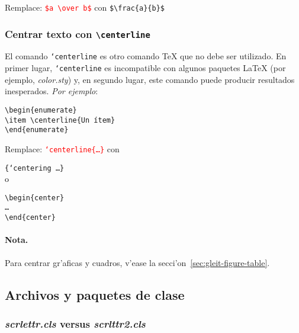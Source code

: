 \documentclass[11pt,a4paper,pagesize,tablecaptionabove,abstracton,pointlessnumbers]{scrartcl}
\newcommand{\Paket}[1]{\textsf{\textsl{#1.sty}}\xspace}
\newcommand{\Klasse}[1]{\textsf{\textsl{#1.cls}}\xspace}
\newcommand{\Env}[2]{\raggedright\texttt{\textbackslash begin\{#1\}\\
    #2\\ \textbackslash end\{#1\}}}
\DeclareRobustCommand*{\Macro}[1]{\mbox{\texttt{\char`\\#1}}}
\DeclareRobustCommand*{\LMacro}[2]{\mbox{\texttt{\char`\\#1\{#2\}}}}
\DeclareRobustCommand*{\GMacro}[2]{\mbox{\texttt{\{\char`\\#1\ #2\}}}}
\newcommand{\Ersetze}[2]{\par\noindent Remplace: \textcolor{red}{#1}
  con \textcolor{gruen}{#2}}
\begin{document}
\Ersetze{\texttt{\$a \textbackslash over b\$}}%
{\texttt{\$\textbackslash frac\{a\}\{b\}\$}}

\subsubsection{Centrar texto con \texttt{\textbackslash centerline}}
\label{sec:centerline}

El comando \Macro{centerline} es otro comando \TeX{} que no debe ser utilizado. En primer lugar, \Macro{centerline} es incompatible con algunos paquetes \LaTeX{} (por ejemplo, \Paket{color}) y, en segundo lugar, este comando puede producir resultados inesperados.  
\emph{Por ejemplo}:
\begin{center}
  \begin{minipage}[t]{.45\textwidth}
\begin{verbatim}
\begin{enumerate}
\item \centerline{Un ítem}
\end{enumerate}
\end{verbatim}
  \end{minipage}%
  \hfill%
\end{center}
\Ersetze{\LMacro{centerline}{\dots}}%
{\parbox[t]{.3\textwidth}{%
  \GMacro{centering}{\dots}\\
\textcolor{black}{o}\\
\Env{center}{\dots}
}}

\paragraph{Nota.}
\label{sec:anmerkung-5}

Para centrar gr'aficas y cuadros, v'ease la secci'on~\vref{sec:gleit-figure-table}.

\subsection{Archivos y paquetes de clase}
\label{sec:pakete}

\subsubsection{\Klasse{scrlettr} versus \Klasse{scrlttr2}}
\label{sec:paketscrl-vs.-pakets}
\end{document}
